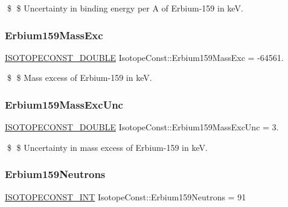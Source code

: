 \$ \$ Uncertainty in binding energy per A of Erbium-\/159 in keV. \mbox{\label{group___isotope_const-_erbium-_er159_ga46089f4a950da64af4e4ea67a6abf358}} 
\subsubsection{\texorpdfstring{Erbium159\+Mass\+Exc}{Erbium159MassExc}}
{\footnotesize\ttfamily \mbox{\hyperlink{group___isotope_const-_macros_ga8f45a7272ce02c0b4c65c44636ed719a}{I\+S\+O\+T\+O\+P\+E\+C\+O\+N\+S\+T\+\_\+\+D\+O\+U\+B\+LE}} Isotope\+Const\+::\+Erbium159\+Mass\+Exc = -\/64561.}

\$ \$ Mass excess of Erbium-\/159 in keV. \mbox{\label{group___isotope_const-_erbium-_er159_ga9839360025e7e533fed40ade6ed13292}} 
\subsubsection{\texorpdfstring{Erbium159\+Mass\+Exc\+Unc}{Erbium159MassExcUnc}}
{\footnotesize\ttfamily \mbox{\hyperlink{group___isotope_const-_macros_ga8f45a7272ce02c0b4c65c44636ed719a}{I\+S\+O\+T\+O\+P\+E\+C\+O\+N\+S\+T\+\_\+\+D\+O\+U\+B\+LE}} Isotope\+Const\+::\+Erbium159\+Mass\+Exc\+Unc = 3.}

\$ \$ Uncertainty in mass excess of Erbium-\/159 in keV. \mbox{\label{group___isotope_const-_erbium-_er159_gae5de86e030b7ba04cde36f9ab64b56a5}} 
\subsubsection{\texorpdfstring{Erbium159\+Neutrons}{Erbium159Neutrons}}
{\footnotesize\ttfamily \mbox{\hyperlink{group___isotope_const-_macros_ga5f18360b3e99483a35c32d789e62621c}{I\+S\+O\+T\+O\+P\+E\+C\+O\+N\+S\+T\+\_\+\+I\+NT}} Isotope\+Const\+::\+Erbium159\+Neutrons = 91}

